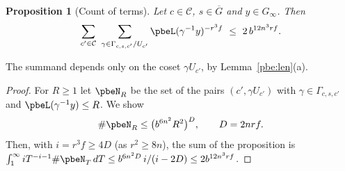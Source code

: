 \documentclass[10pt]{amsart}
\newtheorem{proposition}[theorem]{Proposition}
\theoremstyle{definition}
\theoremstyle{remark}
\providecommand{\auG}{\overline G}
\begin{document}
\begin{proposition}[Count of terms]\label{pbe:count}
Let $c\in\mathcal C$, $s\in\auG$ and $y\in G_\infty$. Then
\[
\sum_{c'\in\mathcal C}\ \sum_{\gamma\in\Gamma_{c,s,c'}/U_{c'}}\pbeL(\gamma^{-1}y)^{-r^3f}\ \le\ 2\,b^{
12n^3rf}.
\]
\end{proposition}
The summand depends only on the coset $\gamma U_{c'}$, by Lemma~\ref{pbe:len}(a).
\begin{proof}
For $R\ge1$ let $\pbeN_R$ be the set of the pairs $(c',\gamma U_{c'})$ with $\gamma\in\Gamma_{c,s,c'}$
and $\pbeL(\gamma^{-1}y)\le R$. We show
\begin{equation}\label{pbe:eq-pack}
\#\pbeN_R\le\bigl(b^{6n^2}R^2\bigr)^{D},\qquad D=2nrf .
\end{equation}
Then, with $i=r^3f\ge4D$ (as $r^2\ge8n$), the sum of the proposition is
$\int_1^\infty iT^{-i-1}\#\pbeN_T\,dT\le b^{6n^2D}\,i/(i-2D)\le2b^{12n^3rf}$.


\end{proof}
\end{document}
